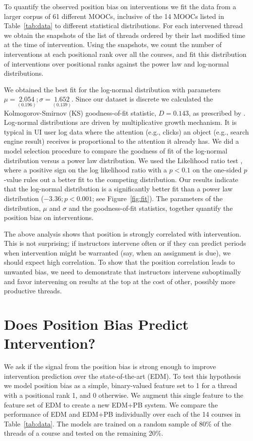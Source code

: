 \documentclass[11pt,a4paper]{article}
\begin{document}
To quantify the observed position bias on interventions we fit the
data from a larger corpus of 61 different MOOCs, inclusive of the 14
MOOCs listed in Table~\ref{tab:data} to different statistical
distributions. For each intervened thread we obtain the snapshots of
the list of threads ordered by their last modified time at the time of
intervention. Using the snapshots, we count the number of
interventions at each positional rank over all the courses, and fit
this distribution of interventions over positional ranks against the
power law and log-normal distributions.  


We obtained the best fit for the log-normal distribution with
parameters $\mu = \underset{(0.196)}{2.054};\sigma =
\underset{(0.139)}{1.652}$.  Since our dataset is discrete we
calculated the Kolmogorov-Smirnov (KS) goodness-of-fit statistic, $D =
0.143$, as prescribed by \cite{d1986goodness}. 
Log-normal distributions are driven by multiplicative growth mechanism. 
It is typical in UI user log data where the attention (e.g., clicks) 
an object (e.g., search engine result) receives is proportional to the 
attention it already has. We did a model
selection procedure to compare the goodness of fit of the log-normal
distribution versus a power law distribution. We used the Likelihood
ratio test \cite{clauset2009powerlaw}, where a positive sign on the log
likelihood ratio with a $p < 0.1$ on the one-sided $p$-value rules out
a better fit to the competing distribution.
Our results indicate that the log-normal distribution is a
significantly better fit than a power law distribution ($-3.36; p <
0.001$; see Figure~\ref{fig:fit}).
The parameters of the distribution, $\mu$ and $\sigma$ and 
the goodness-of-fit statistics, together quantify the position 
bias on interventions.

The above analysis shows that position is strongly correlated with
intervention.  This is not surprising; if instructors intervene often
or if they can predict periods when intervention might be warranted
(say, when an assignment is due), we should expect high correlation.
To show that the position correlation leads to unwanted bias, we need to
demonstrate that instructors intervene suboptimally and favor
intervening on results at the top at the cost of other, possibly more
productive threads.  


\section{Does Position Bias Predict Intervention?}
We ask if the signal from the position bias is strong enough to
improve intervention prediction over the state-of-the-art (EDM). To
test this hypothesis we model position bias as a simple, binary-valued
feature set to 1 for a thread with a positional rank 1, and 0
otherwise. We augment this single feature to the feature set of EDM
to create a new EDM+PB system. We compare the performance of EDM
and EDM+PB individually over each of the 14 courses in
Table~\ref{tab:data}. 
The models are trained on a random sample of 80\% of the threads of a course
and tested on the remaining 20\%.
\end{document}
